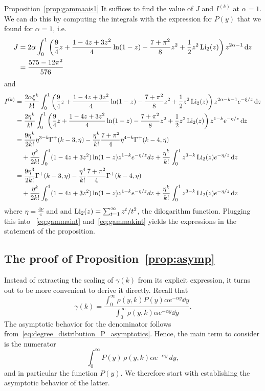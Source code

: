 \begin{proofof}{Proposition~\ref{prop:gammaais1}}
It suffices to find the value of $J$ and $I^{(k)}$ 
at $\alpha = 1$. We can do this by computing the integrals with the expression for $P(y)$ that we found for $\alpha=1$, i.e.
\begin{align*}
	J &= 2\alpha\int_0^1 \left(\frac{9}{4} z + \frac{1 - 4 z + 3 z^2}{4}\ln(1 - z) - \frac{7+\pi^2}{8}
		z^2  + \frac{1}{2}z^2 \operatorname{Li}_2(z)\right) z^{2\alpha -1} \operatorname{\mathrm{d}\hspace{-2pt}} z \\
	&=\frac{575-12\pi^2}{576}
\end{align*}
and 
\begin{align*}
	I^{(k)} &= \frac{2\alpha \xi^k}{k!}\int_0^1 \left(\frac{9}{4} z + \frac{1 - 4 z + 3 z^2}{4}\ln(1 - z) 
		- \frac{7+\pi^2}{8}	z^2  + \frac{1}{2}z^2 \operatorname{Li}_2(z) \right)z^{2\alpha-k-1} e^{-\xi/z} \operatorname{\mathrm{d}\hspace{-2pt}} z \\
	&= \frac{2 \eta^k}{k!}\int_0^1 \left(\frac{9}{4} z + \frac{1 - 4 z + 3 z^2}{4}\ln(1 - z) 
		- \frac{7+\pi^2}{8} z^2  + \frac{1}{2}z^2 \operatorname{Li}_2(z) \right)z^{1-k} e^{-\eta/z} \operatorname{\mathrm{d}\hspace{-2pt}} z \\
	&= \frac{9 \eta^k}{2 k!}\eta^{3-k}\Gamma^+(k-3,\eta)-\frac{\eta^k}{k!}\frac{7+\pi^2}{4}\eta^{4-k}\Gamma^+(k-4,\eta)\\
	&\hspace{10pt}+ \frac{\eta^k}{2k!}\int_0^1 (1-4z+3z^2)\ln(1-z)z^{1-k}e^{-\eta/z}dz+\frac{\eta^k}{k!}\int_0^1 z^{3-k} 
		\operatorname{Li}_2(z) e^{-\eta/z} \operatorname{\mathrm{d}\hspace{-2pt}} z \\
	&=\frac{9 \eta^3}{2 k!}\Gamma^+(k-3,\eta)-\frac{\eta^4}{k!}\frac{7+\pi^2}{4}\Gamma^+(k-4,\eta)\\
	&\hspace{10pt}+ \frac{\eta^k}{2k!}\int_0^1 (1-4z+3z^2)\ln(1-z)z^{1-k}e^{-\eta/z}dz+\frac{\eta^k}{k!}\int_0^1 z^{3-k} 
		\operatorname{Li}_2(z) e^{-\eta/z} \operatorname{\mathrm{d}\hspace{-2pt}} z
\end{align*}
where $\eta = \frac{4\nu}{\pi}$ and and $\operatorname{Li}_2(z) = \sum_{t = 1}^\infty z^t/t^2$, the dilogarithm function. 
Plugging this into ~\eqref{eq:gammaint} and~\eqref{eq:gammakint} yields the expressions in the statement of the proposition.
\end{proofof}


\subsection{The proof of Proposition~\ref{prop:asymp}\label{ssec:asymptotics_local_clustering_P}}

Instead of extracting the scaling of $\gamma(k)$ from its explicit expression, it turns out to be more convenient to derive it directly. Recall that
\[
	\gamma(k) = \frac{\int_0^\infty \rho(y,k) P(y) \alpha e^{-\alpha y} \dd y}{\int_0^\infty \rho(y,k) \alpha e^{-\alpha y} \dd y}.
\]
The asymptotic behavior for the denominator follows from~\eqref{eq:degree_distribution_P_asymptotics}. Hence, the main term to consider is the numerator
\[
	\int_0^{\infty} P(y) \, \rho(y,k) \alpha e^{-\alpha y} \, dy,
\]
and in particular the function $P(y)$. We therefore start with establishing the asymptotic behavior of the latter. 


